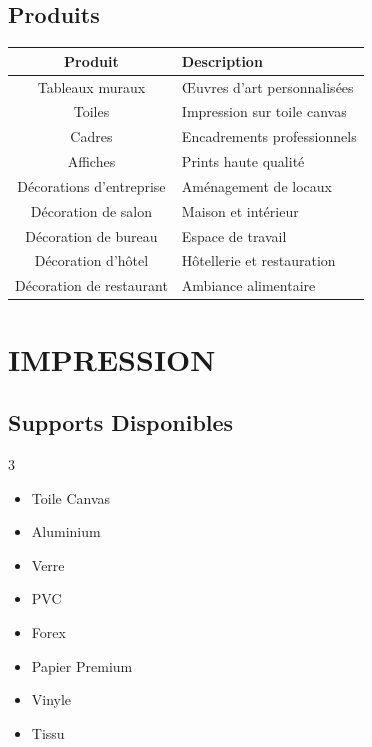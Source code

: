 \documentclass[12pt,a4paper,oneside]{book}
\begin{document}
\section{Produits}
\begin{center}
\begin{tabular}{|c|p{10cm}|}
\hline
\rowcolor{electronblue}
\color{white}\textbf{Produit} & \color{white}\textbf{Description} \\
\hline
Tableaux muraux & Œuvres d'art personnalisées \\
\hline
Toiles & Impression sur toile canvas \\
\hline
Cadres & Encadrements professionnels \\
\hline
Affiches & Prints haute qualité \\
\hline
Décorations d'entreprise & Aménagement de locaux \\
\hline
Décoration de salon & Maison et intérieur \\
\hline
Décoration de bureau & Espace de travail \\
\hline
Décoration d'hôtel & Hôtellerie et restauration \\
\hline
Décoration de restaurant & Ambiance alimentaire \\
\hline
\end{tabular}
\end{center}

\chapter{IMPRESSION}

\section{Supports Disponibles}
\begin{multicols}{3}
\begin{itemize}
\item Toile Canvas
\item Aluminium
\item Verre
\item PVC
\item Forex
\item Papier Premium
\item Vinyle
\item Tissu
\end{itemize}
\end{multicols}
\end{document}
